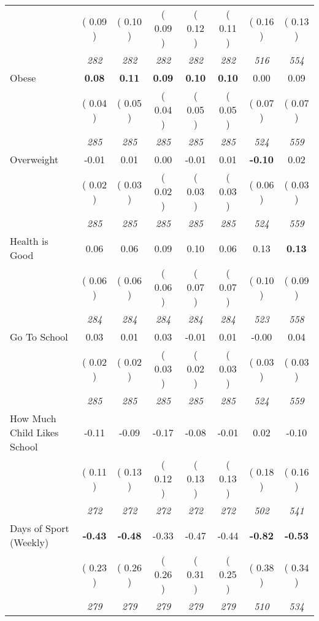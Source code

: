 \begin{tabular}{l c c c c c c c}
& (     0.09 ) & (     0.10 ) & (     0.09 ) & (     0.12 ) & (     0.11 ) & (     0.16 ) & (     0.13 ) \\
& \textit{ 282 } & \textit{ 282 } & \textit{ 282 } & \textit{ 282 } & \textit{ 282 } & \textit{ 516 } & \textit{ 554 } \\
Obese & \textbf{      0.08 } & \textbf{      0.11 } & \textbf{      0.09 } & \textbf{     0.10} & \textbf{     0.10} &      0.00 &      0.09 \\
& (     0.04 ) & (     0.05 ) & (     0.04 ) & (     0.05 ) & (     0.05 ) & (     0.07 ) & (     0.07 ) \\
& \textit{ 285 } & \textit{ 285 } & \textit{ 285 } & \textit{ 285 } & \textit{ 285 } & \textit{ 524 } & \textit{ 559 } \\
Overweight &     -0.01 &      0.01 &      0.00 &     -0.01 &      0.01 & \textbf{     -0.10 } &      0.02 \\
& (     0.02 ) & (     0.03 ) & (     0.02 ) & (     0.03 ) & (     0.03 ) & (     0.06 ) & (     0.03 ) \\
& \textit{ 285 } & \textit{ 285 } & \textit{ 285 } & \textit{ 285 } & \textit{ 285 } & \textit{ 524 } & \textit{ 559 } \\
Health is Good &      0.06 &      0.06 &      0.09 &      0.10 &      0.06 &      0.13 & \textbf{      0.13 } \\
& (     0.06 ) & (     0.06 ) & (     0.06 ) & (     0.07 ) & (     0.07 ) & (     0.10 ) & (     0.09 ) \\
& \textit{ 284 } & \textit{ 284 } & \textit{ 284 } & \textit{ 284 } & \textit{ 284 } & \textit{ 523 } & \textit{ 558 } \\
Go To School &      0.03 &      0.01 &      0.03 &     -0.01 &      0.01 &     -0.00 &      0.04 \\
& (     0.02 ) & (     0.02 ) & (     0.03 ) & (     0.02 ) & (     0.03 ) & (     0.03 ) & (     0.03 ) \\
& \textit{ 285 } & \textit{ 285 } & \textit{ 285 } & \textit{ 285 } & \textit{ 285 } & \textit{ 524 } & \textit{ 559 } \\
How Much Child Likes School &     -0.11 &     -0.09 &     -0.17 &     -0.08 &     -0.01 &      0.02 &     -0.10 \\
& (     0.11 ) & (     0.13 ) & (     0.12 ) & (     0.13 ) & (     0.13 ) & (     0.18 ) & (     0.16 ) \\
& \textit{ 272 } & \textit{ 272 } & \textit{ 272 } & \textit{ 272 } & \textit{ 272 } & \textit{ 502 } & \textit{ 541 } \\
Days of Sport (Weekly) & \textbf{     -0.43 } & \textbf{     -0.48 } &     -0.33 &     -0.47 &     -0.44 & \textbf{     -0.82 } & \textbf{     -0.53 } \\
& (     0.23 ) & (     0.26 ) & (     0.26 ) & (     0.31 ) & (     0.25 ) & (     0.38 ) & (     0.34 ) \\
& \textit{ 279 } & \textit{ 279 } & \textit{ 279 } & \textit{ 279 } & \textit{ 279 } & \textit{ 510 } & \textit{ 534 } \\
\bottomrule
\end{tabular}
